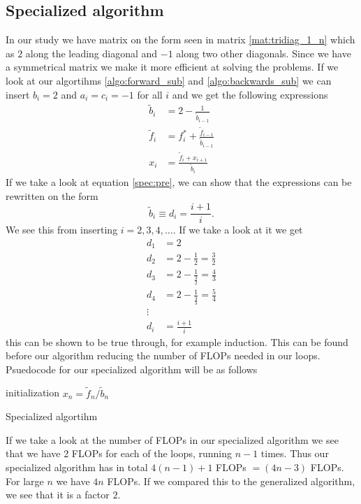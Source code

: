 \documentclass[10pt, a4paper]{amsart}
\begin{document}
\subsection{Specialized algorithm}
In our study we have matrix on the form seen in matrix \ref{mat:tridiag_1_n} which as $2$ along the leading diagonal and $-1$ along two other diagonals. Since we have a symmetrical matrix we make it more efficient at solving the problems. If we look at our algortihms \ref{algo:forward_sub} and \ref{algo:backwards_sub} we can insert $b_i = 2$ and $a_i = c_i = -1$ for all $i$ and we get the following expressions
\begin{align}
	\tilde{b}_i &= 2 - \frac{1}{\tilde{b}_{i-1}}\label{spec:pre}\\
	\tilde{f}_i &= f^*_i + \frac{\tilde{f}_{i-1}}{\tilde{b}_{i-1}}\\
	x_i &= \frac{\tilde{f}_i + x_{i+1}}{\tilde{b}_i}
\end{align}
If we take a look at equation \ref{spec:pre}, we can show that the expressions can be rewritten on the form 
\begin{equation}
 \tilde{b}_i \equiv d_i = \frac{i+1}{i}.
\end{equation}
We see this from inserting $i = 2, 3, 4, \dots$. If we take a look at it we get 
\begin{align*}
	d_1 &= 2 \\
	d_2 &= 2 - \frac{1}{2} = \frac{3}{2}\\
	d_3 &= 2 - \frac{1}{\frac{3}{2}} = \frac{4}{3}\\
	d_4 &= 2 - \frac{1}{\frac{4}{3}} = \frac{5}{4}\\
	\vdots\\
	d_i &= \frac{i+1}{i}
\end{align*}
this can be shown to be true through, for example induction. This can be found before our algorithm reducing the number of FLOPs needed in our loops. Psuedocode for our specialized algorithm will be as follows 

\begin{algorithm}[H]\label{psudo:spec}
\SetAlgoLined
 initialization\;
 $x_n = \tilde{f}_n/\tilde{b}_n$\;
\caption{Specialized algortihm}
\end{algorithm}

If we take a look at the number of FLOPs in our specialized algorithm we see that we have 2 FLOPs for each of the loops, running $n-1$ times. Thus our specialized algorithm has in total $4(n-1)+1$ FLOPs $=(4n-3)$ FLOPs. For large $n$ we have $4n$ FLOPs. If we compared this to the generalized algorithm, we see that it is a factor $2$. 
\end{document}
